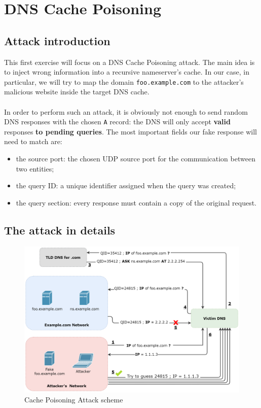\documentclass[11pt,a4paper]{article}
\begin{document}
\section{DNS Cache Poisoning}

\subsection{Attack introduction}
This first exercise will focus on a DNS Cache Poisoning attack. The main idea is
to inject wrong information into a recursive nameserver’s cache. In our case, in particular, we
will try to map the domain \texttt{foo.example.com} to the attacker’s
malicious website inside the target DNS cache.
\\
\\
\noindent
In order to perform such an attack, it is obviously not enough to send random DNS responses
with the chosen \texttt{A} record: the DNS will only accept \textbf{valid} responses \textbf{to pending queries}. The most important fields our fake response will need to match are:
\begin{itemize}
    \item the source port: the chosen UDP source port for the communication between two entities;
    \item the query ID: a unique identifier assigned when the query was created;
    \item the query section: every response must contain a copy of the original request.
\end{itemize}

\subsection{The attack in details}
\label{subsec:attack-details}

\begin{figure}[h]
    \centering
    \includegraphics[width=\textwidth]{cache-poisoning-attack.png}
    \caption{Cache Poisoning Attack scheme}
    \label{fig:cache-poisoning-attack}
\end{figure}
\end{document}
